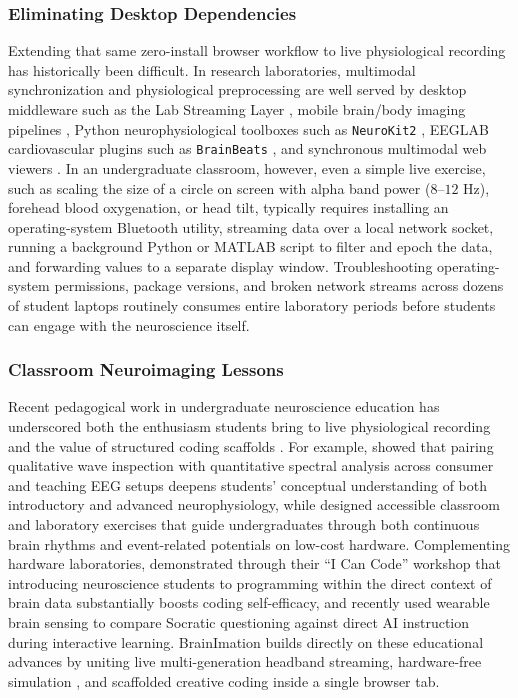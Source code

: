 \documentclass[11pt]{article}
\begin{document}
\subsubsection{Eliminating Desktop Dependencies}
Extending that same zero-install browser workflow to live physiological recording has historically been difficult. In research laboratories, multimodal synchronization and physiological preprocessing are well served by desktop middleware such as the Lab Streaming Layer \citep{kothe2025lsl}, mobile brain/body imaging pipelines \citep{klug2022bemobil}, Python neurophysiological toolboxes such as \texttt{NeuroKit2} \citep{makowski2021neurokit2}, EEGLAB cardiovascular plugins such as \texttt{BrainBeats} \citep{cannard2024brainbeats}, and synchronous multimodal web viewers \citep{pijalek2026meedav}. In an undergraduate classroom, however, even a simple live exercise, such as scaling the size of a circle on screen with alpha band power ($8\text{--}12\text{ Hz}$), forehead blood oxygenation, or head tilt, typically requires installing an operating-system Bluetooth utility, streaming data over a local network socket, running a background Python or MATLAB script to filter and epoch the data, and forwarding values to a separate display window. Troubleshooting operating-system permissions, package versions, and broken network streams across dozens of student laptops routinely consumes entire laboratory periods before students can engage with the neuroscience itself.

\subsubsection{Classroom Neuroimaging Lessons}
Recent pedagogical work in undergraduate neuroscience education has underscored both the enthusiasm students bring to live physiological recording and the value of structured coding scaffolds \citep{janssen2021opportunities,hatton2023quantitative,smith2024lowcost,iemi2026icancode}. For example, \citet{hatton2023quantitative} showed that pairing qualitative wave inspection with quantitative spectral analysis across consumer and teaching EEG setups deepens students' conceptual understanding of both introductory and advanced neurophysiology, while \citet{smith2024lowcost} designed accessible classroom and laboratory exercises that guide undergraduates through both continuous brain rhythms and event-related potentials on low-cost hardware. Complementing hardware laboratories, \citet{iemi2026icancode} demonstrated through their ``I Can Code'' workshop that introducing neuroscience students to programming within the direct context of brain data substantially boosts coding self-efficacy, and \citet{clindeffarges2026socrates} recently used wearable brain sensing to compare Socratic questioning against direct AI instruction during interactive learning. BrainImation builds directly on these educational advances by uniting live multi-generation headband streaming, hardware-free simulation \citep{deleeuw2023simulating}, and scaffolded creative coding inside a single browser tab.
\end{document}
